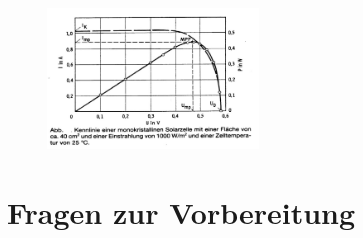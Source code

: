 \begin{figure}[h]
	\centering
		\includegraphics[width=0.5\textwidth]{Abbildungen/Leistung.jpg}
	\label{fig:Leistung}
\end{figure}

\section{Fragen zur Vorbereitung}

